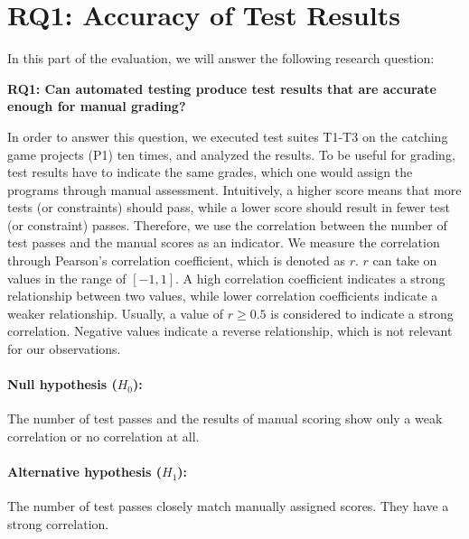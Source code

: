 \section{RQ1: Accuracy of Test Results}
\label{sec:rq1}

In this part of the evaluation, we will answer the following research question:

\begin{center}\begin{minipage}{.9\textwidth}
    \textbf{RQ1: Can automated testing produce test results that are accurate enough for manual grading?}
\end{minipage}\end{center}

\noindent In order to answer this question,
we executed test suites T1-T3 on the catching game projects (P1) ten times,
and analyzed the results.
To be useful for grading,
test results have to indicate the same grades,
which one would assign the programs through manual assessment.
Intuitively, a higher score means that more tests (or constraints) should pass,
while a lower score should result in fewer test (or constraint) passes.
Therefore, we use the correlation between the number of test passes and the manual scores as an indicator.
We measure the correlation through Pearson's correlation coefficient, which is denoted as $r$.
$r$ can take on values in the range of $[-1, 1]$.
A high correlation coefficient indicates a strong relationship between two values,
while lower correlation coefficients indicate a weaker relationship.
Usually, a value of $r \ge 0.5$ is considered to indicate a strong correlation.
Negative values indicate a reverse relationship, which is not relevant for our observations.

\paragraph{Null hypothesis ($H_0$):}
The number of test passes and the results of manual scoring show only a weak correlation or no correlation at all.
\vspace{-\medskipamount}
\paragraph{Alternative hypothesis ($H_1$):}
The number of test passes closely match manually assigned scores.
They have a strong correlation.

